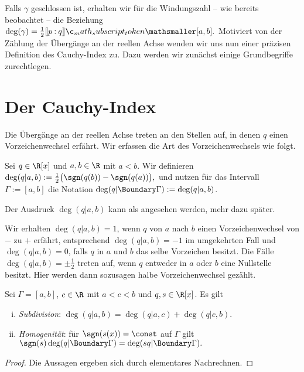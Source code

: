 \documentclass{mythesis}
\begin{document}
Falls $\gamma$ geschlossen ist, erhalten wir für die Windungszahl – wie bereits beobachtet – die Beziehung
\begin{math}
    \deg(\gamma) = \frac{1}{2} \Index{[a,b]}{p}{q}.
\end{math}
Motiviert von der Zählung der Übergänge an der reellen Achse wenden wir uns nun einer präzisen Definition des Cauchy-Index zu.
Dazu werden wir zunächst einige Grundbegriffe zurechtlegen.



\section{Der Cauchy-Index}

Die Übergänge an der reellen Achse treten an den Stellen auf, in denen $q$ einen Vorzeichenwechsel erfährt.
Wir erfassen die Art des Vorzeichenwechsels wie folgt.

\begin{definition}
    Sei $q \in \R[x]$ und $a, b \in \R$ mit $a < b$.
    Wir definieren
    \begin{math}
        \deg(q|a,b) := \frac{1}{2} \big(\sgn(q(b)) - \sgn(q(a)) \big),
    \end{math}
    und nutzen für das Intervall $\Gamma := [a,b]$ die Notation $\deg(q|\Boundary\Gamma) := \deg(q|a,b)$.
    \begin{note}
        Der Ausdruck $\deg(q|a,b)$ kann als  angesehen werden, mehr dazu später.
    \end{note}
\end{definition}

Wir erhalten $\deg(q|a,b) = 1$, wenn $q$ von $a$ nach $b$ einen Vorzeichenwechsel von $-$ zu $+$ erfährt, entsprechend $\deg(q|a,b) = -1$ im umgekehrten Fall und $\deg(q|a,b) = 0$, falls $q$ in $a$ und $b$ das selbe Vorzeichen besitzt.
Die Fälle $\deg(q|a,b) = \pm \frac{1}{2}$ treten auf, wenn $q$ entweder in $a$ oder $b$ eine Nullstelle besitzt.
Hier werden dann sozusagen halbe Vorzeichenwechsel gezählt.

\begin{lemma}[Eigenschaften] \label{thm:lem:wn0_prop}
    Sei $\Gamma = [a,b]$, $c \in \R$ mit $a < c < b$ und $q, s \in \R[x]$.
    Es gilt
    \begin{enumerate}[i)]
        \item
            \emph{Subdivision}: $\deg(q|a,b) = \deg(q|a,c) + \deg(q|c,b)$.
        \item
            \emph{Homogenität}: für $\sgn(s(x)) = \const$ auf $\Gamma$ gilt
            \begin{math}
                \sgn(s) \deg(q|\Boundary\Gamma) = \deg(sq|\Boundary\Gamma).
            \end{math}
    \end{enumerate}
    \begin{proof}
        Die Aussagen ergeben sich durch elementares Nachrechnen.
    \end{proof}
\end{lemma}
\end{document}

